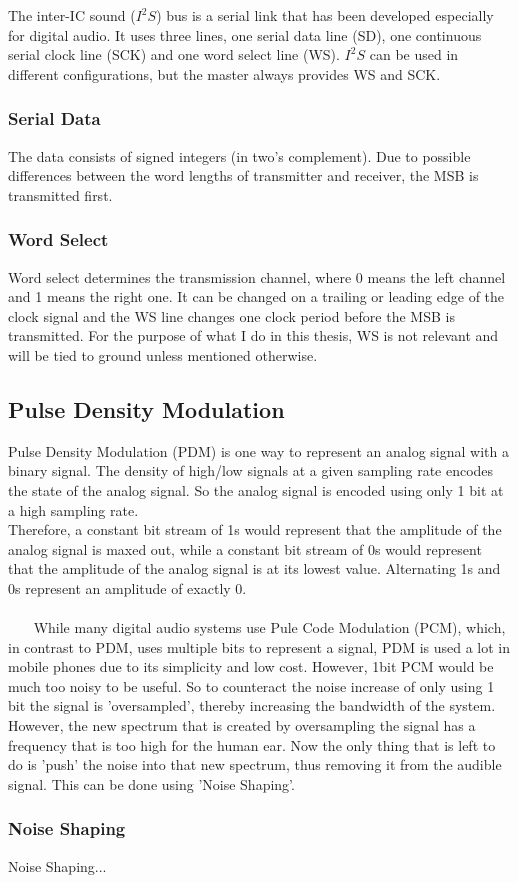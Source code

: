 The inter-IC sound ($I^2S$) \cite{i2s} bus is a serial link that has been developed especially for digital audio.
It uses three lines, one serial data line (SD), one continuous serial clock line (SCK) and one word select line (WS).
$I^2S$ can be used in different configurations, but the master always provides WS and SCK.

\subsubsection{Serial Data}

The data consists of signed integers (in two's complement).
Due to possible differences between the word lengths of transmitter and receiver,
the MSB is transmitted first.


\subsubsection{Word Select}

Word select determines the transmission channel, where 0 means the left channel and 1 means the right one.
It can be changed on a trailing or leading edge of the clock signal and the WS line changes one clock period
before the MSB is transmitted.
For the purpose of what I do in this thesis, WS is not relevant and will be tied to ground unless mentioned otherwise.

\subsection{Pulse Density Modulation}

Pulse Density Modulation (PDM) is one way to represent an analog signal with a binary signal.
The density of high/low signals at a given sampling rate encodes the state of the analog signal.
So the analog signal is encoded using only 1 bit at a high sampling rate.\\
Therefore, a constant bit stream of 1s would represent that the amplitude of the analog signal is maxed out,
while a constant bit stream of 0s would represent that the amplitude of the analog signal is at its lowest value.
Alternating 1s and 0s represent an amplitude of exactly 0.\\\\
\
\
\
While many digital audio systems use Pule Code Modulation (PCM), which, in contrast to PDM, uses multiple bits to represent a signal,
PDM is used a lot in mobile phones \cite{pdm_utexas} due to its simplicity and low cost.
However, 1bit PCM would be much too noisy to be useful.
So to counteract the noise increase of only using 1 bit the signal is 'oversampled', thereby increasing the bandwidth of the system.
However, the new spectrum that is created by oversampling the signal has a frequency that is too high for the human ear.
Now the only thing that is left to do is 'push' the noise into that new spectrum, thus removing it from the audible signal.
This can be done using 'Noise Shaping'.

\subsubsection{Noise Shaping}

Noise Shaping...


